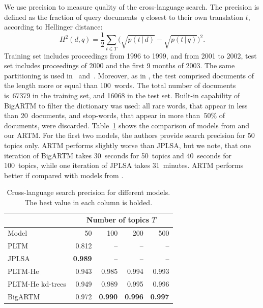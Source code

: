 \documentclass{acm_proc_article-sp}
\newcommand{\cond}{\mspace{3mu}{|}\mspace{3mu}}
\begin{document}
We use precision to measure quality of the cross-language search.
The precision is defined as the fraction of query documents~$q$ closest to their own translation $t$,
according to Hellinger distance:
\[
    H^2(d,q)= \frac12 \sum_{t\in T} \bigl( \sqrt{p(t\cond d)} - \sqrt{p(t\cond q)} \bigr)^2 .
\]
Training set includes proceedings from 1996 to 1999, and from 2001 to 2002,
test set includes proceedings of 2000 and the first 9 months of 2003.
The same partitioning is used in~\cite{platt10translingual} and~\cite{mimno12sparse}.
Moreover, as in \cite{mimno09polylingual,mimno12sparse},
the test comprised documents of the length more or equal than 100~words.
The total number of documents is~67379 in the training set, and 16068 in the test set.
Built-in capability of BigARTM to filter the dictionary was used:
all rare words, that appear in less than 20~documents, and stop-words, that appear in more than~50\% of documents, were discarded.
Table~\ref{tab:cross-lingual} shows the comparison of
models from \cite{mimno09polylingual,platt10translingual,mimno12sparse} and our ARTM.
For the first two models, the authors provide search precision for 50 topics only.
ARTM performs slightly worse than JPLSA, but we note, that
one iteration of BigARTM takes 30~seconds for 50~topics and 40~seconds for 100~topics,
while one iteration of JPLSA takes 31~minutes.
ARTM performs better if compared with models from \cite{mimno12sparse}.

\begin{table}[t]
\caption{Cross-language search precision for different models. The best value in each column is bolded.}
\label{tab:cross-lingual}
\medskip\centering\tabcolsep=4.3pt
\begin{tabular}{l|rrrr}
\hline
	& \multicolumn{4}{c}{Number of topics $T$} \\
\hline
Model &	50	&100	&200	&500 \\
\hline
PLTM \cite{mimno09polylingual}          &0.812  &  --  &  --  &  --  \\
JPLSA \cite{platt10translingual}        &\textbf{0.989}  &  --  &  --  &  --  \\
PLTM-He \cite{mimno12sparse}            &0.943  &0.985 &0.994 &0.993 \\
PLTM-He kd-trees \cite{mimno12sparse}	&0.949	&0.989 &0.995 &0.996 \\
\hline
BigARTM	                                &0.972	&\textbf{0.990} &\textbf{0.996} &\textbf{0.997} \\
\hline
\end{tabular}
\end{table}
\end{document}
